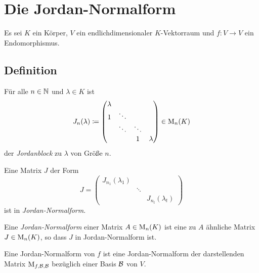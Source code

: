 \chapter{Die Jordan-Normalform}

Es sei $K$ ein Körper, $V$ ein endlichdimensionaler $K$-Vektorraum und $f \colon V \to V$ ein Endomorphismus.





\section{Definition}

\begin{definition}
  Für alle $n \in \mathbb{N}$ und $\lambda \in K$ ist
  \[
              J_n(\lambda)
    \coloneqq \begin{pmatrix}
                \lambda &         &         &         \\
                1       & \ddots  &         &         \\
                        & \ddots  & \ddots  &         \\
                        &         & 1       & \lambda
              \end{pmatrix}
    \in       \operatorname{M}_{n}(K)
  \]
  der \emph{Jordanblock} zu $\lambda$ von Größe $n$.
\end{definition}

\begin{definition}
  Eine Matrix $J$ der Form
  \[
      J
    = \begin{pmatrix}
        J_{n_1}(\lambda_1)  &         &                     \\
                            & \ddots  &                     \\
                            &         & J_{n_t}(\lambda_t)
      \end{pmatrix}
  \]
  ist in \emph{Jordan-Normalform}.
\end{definition}

\begin{definition}
  Eine \emph{Jordan-Normalform} einer Matrix $A \in \operatorname{M}_{n}(K)$ ist eine zu $A$ ähnliche Matrix $J \in \operatorname{M}_{n}(K)$, so dass $J$ in Jordan-Normalform ist.
  
  Eine Jordan-Normalform von $f$ ist eine Jordan-Normalform der darstellenden Matrix $\operatorname{M}_{f, \mathcal{B}, \mathcal{B}}$ bezüglich einer Basis $\mathcal{B}$ von $V$.
\end{definition}

